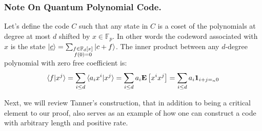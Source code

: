 \documentclass[manuscript,screen,review]{acmart}
\begin{document}
\subsubsection{Note On Quantum Polynomial Code.} 
Let's define the code $C$ such that any state in $C$ is a coset of the polynomials at degree at most $d$ shifted by $x \in \mathbb{F}_{p}$. In other words the codeword associated with $x$ is the state $\ket{\underline{c}} = \sum_{ \substack{ f \in \mathbb{F}_{d}[x] \\  f(0) = 0}}{ \ket{ c + f}} $. The inner product between any $d$-degree polynomial with zero free coefficient is:
\begin{equation*}
  \begin{split}
    \braket{ f | x^{j} } = \sum_{i \le d }{ \braket{a_{i} x^{i} | x^{j}}} = \sum_{i \le d}{ a_{i} \mathbf{E} \left[ { x^{i}x^{j}   } \right]} =  \sum_{i \le d}{ a_{i } \mathbf{1}_{ i + j =_{n} 0 }}
  \end{split}
\end{equation*}


Next, we will review Tanner's construction, that in addition to being a critical element to our proof, also serves as an example of how one can construct a code with arbitrary length and positive rate.


\printbibliography 
\end{document}

